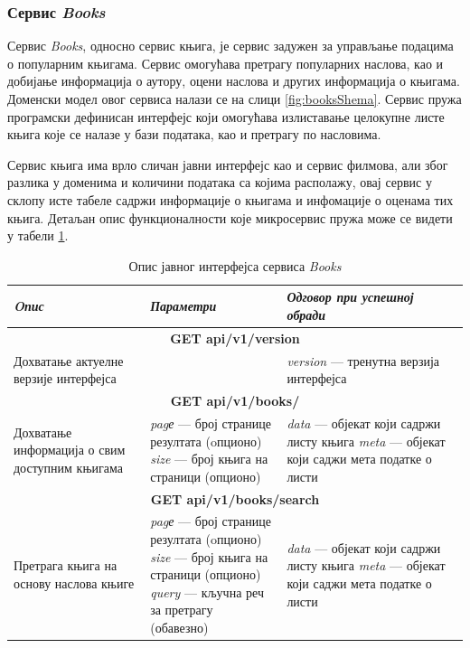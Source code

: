 \documentclass[12pt,oneside]{memoir}
\begin{document}
\newpage

\subsubsection{Сервис \textit{Books}}

Сервис \textit{Books}, односно сервис књига, је сервис задужен за управљање подацима о популарним књигама. Сервис омогућава претрагу популарних наслова, као и добијање информација о аутору, оцени наслова и других информација о књигама. Доменски модел овог сервиса налази се на слици \ref{fig:booksShema}. 
Сервис пружа програмски дефинисан интерфејс који омогућава излиставање целокупне листе књига које се налазе у бази података, као и претрагу по насловима.
\newpage

Сервис књига има врло сличан јавни интерфејс као и сервис филмова, али због разлика у доменима и количини података са којима располажу, овај сервис у склопу исте табеле садржи информације о књигама и инфомације о оценама тих књига. Детаљан опис функционалности које микросервис пружа може се видети у табели \ref{tbl:booksAPI}.


\begin{table}
\caption{Опис јавног интерфејса сервиса \textit{Books}}
\label{tbl:booksAPI}
\begin{tabular}{ |  p{0.3\linewidth} | p{0.3\linewidth}|  p{0.4\linewidth} | }
\hline
\textit{Oпис} & \textit{Параметри} & \textit{Одговор при успешној обради} \\
\hline
\multicolumn{3}{|c|}{\textbf{GET api/v1/version}} \\
\hline
Дохватање актуелне верзије интерфејса & & 
\textit{version} --- тренутна верзија интерфејса \\
\hline
\multicolumn{3}{|c|}{\textbf{GET api/v1/books/}} \\
\hline
Дохватање информација о свим доступним књигама & 
\textit{pagе} --- број странице резултата (oпционо) \newline 
\textit{size} --- број књига на страници (опционо)
& 
\textit{data} --- објекат који садржи листу књига \newline
\textit{meta} --- објекат који саджи мета податке о листи \\
\hline
\multicolumn{3}{|c|}{\textbf{GET api/v1/books/search}} \\
\hline
Претрага књига на основу наслова књиге &
\textit{pagе} --- број странице резултата (oпционо) \newline 
\textit{size} --- број књига на страници (опционо) \newline 
\textit{query} --- кључна реч за претрагу (обавезно) 
  & 
\textit{data} --- објекат који садржи листу књига \newline
\textit{meta} --- објекат који саджи мета податке о листи \\
\hline
\end{tabular}
\end{table}
\end{document}
